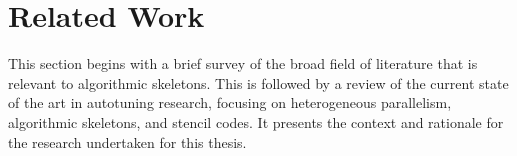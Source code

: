 \documentclass[nonatbib,preprint,10pt]{sigplanconf}
\begin{document}
\section{Related Work}\label{sec:related}

This section begins with a brief survey of the broad field of
literature that is relevant to algorithmic skeletons. This is followed
by a review of the current state of the art in autotuning research,
focusing on heterogeneous parallelism, algorithmic skeletons, and
stencil codes. It presents the context and rationale for the research
undertaken for this thesis.




\end{document}
